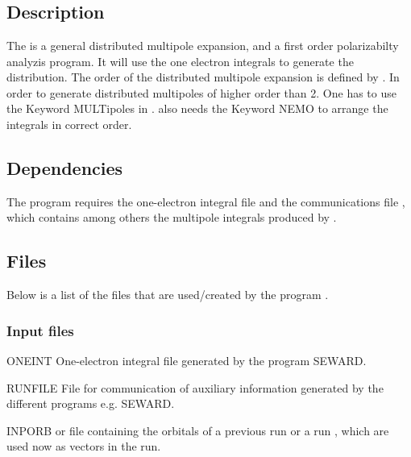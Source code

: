 
\section{}
\label{UG:sec:mpprop}

\subsection{Description}
\label{UG:sec:mpprop_description}

The  is a general distributed multipole expansion, and a first order polarizabilty analyzis program.
It will use the one electron integrals to generate the distribution. The order of the distributed multipole expansion is defined by
. In order to generate distributed multipoles of higher order than 2. One has to use the Keyword
MULTipoles in .  also needs the Keyword NEMO to arrange the integrals in correct order.

\subsection{Dependencies}
\label{UG:sec:mpprop_dependencies}
The  program requires the one-{}electron integral file
 and the communications file ,
which contains among others the
multipole integrals produced by .

\subsection{Files}
\label{UG:sec:mpprop_files}

Below is a list of the files that are used/created by the program
.

\subsubsection{Input files}
\begin{filelist}
\item[ONEINT]
One{}-electron integral file generated by the program {\prgmfont SEWARD}.
\item[RUNFILE]
File for communication of auxiliary information generated by the different programs
e.g. {\prgmfont SEWARD}.
\item[INPORB]
 or  file containing the orbitals of a previous
 run or a  run , which are used now as vectors in the  run.
\end{filelist}


